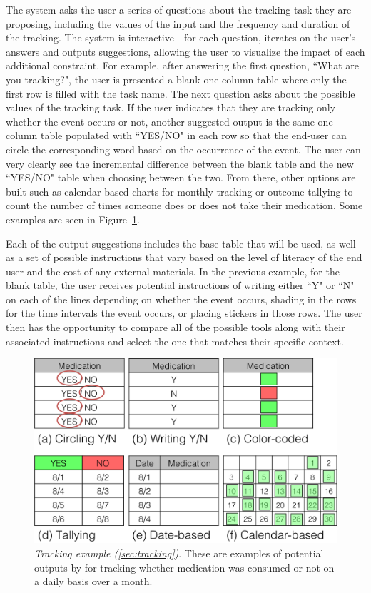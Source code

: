 \documentclass{sig-alternate}
\begin{document}
The system asks the user a series of questions about the tracking task they are proposing, including the values of the input and the frequency and duration of the tracking. The system is interactive---for each question, \nifty iterates on the user's answers and outputs suggestions, allowing the user to visualize the impact of each additional constraint. For example, after answering the first question, ``What are you tracking?", the user is presented a blank one-column table where only the first row is filled with the task name. The next question asks about the possible values of the tracking task. If the user indicates that they are tracking only whether the event occurs or not, another suggested output is the same one-column table populated with ``YES/NO" in each row so that the end-user can circle the corresponding word based on the occurrence of the event. The user can very clearly see the incremental difference between the blank table and the new ``YES/NO" table when choosing between the two. From there, other options are built such as calendar-based charts for monthly tracking or outcome tallying to count the number of times someone does or does not take their medication. Some examples are seen in Figure~\ref{fig:tracking}.

Each of the output suggestions includes the base table that will be used, as well as a set of possible instructions that vary based on the level of literacy of the end user and the cost of any external materials. In the previous example, for the blank table, the user receives potential instructions of writing either ``Y" or ``N" on each of the lines depending on whether the event occurs, shading in the rows for the time intervals the event occurs, or placing stickers in those rows.  The user then has the opportunity to compare all of the possible tools along with their associated instructions and select the one that matches their specific context. 

\begin{figure}
\centering
\includegraphics[width=\linewidth]{img/tracking.png}
\caption{\emph{Tracking example (\ref{sec:tracking})}. These are examples of potential outputs by \nifty for tracking whether medication was consumed or not on a daily basis over a month.}
\label{fig:tracking}
\end{figure}
\end{document}
